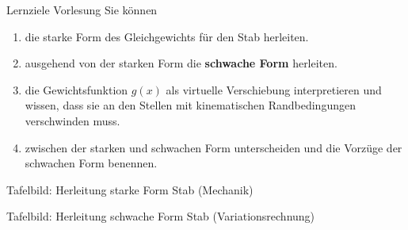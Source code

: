 \documentclass[aspectratio=169,professionalfonts]{beamer}
\begin{document}
\begin{frame}{Lernziele Vorlesung}
  \small
  Sie können
  \begin{enumerate}
    \item die starke Form des Gleichgewichts für den Stab herleiten.
    \item ausgehend von der starken Form die \textbf{schwache Form} herleiten.
    \item die Gewichtsfunktion $g(x)$ als virtuelle Verschiebung interpretieren und wissen, dass sie an den Stellen mit kinematischen Randbedingungen verschwinden muss.
    \item zwischen der starken und schwachen Form unterscheiden und die Vorzüge der schwachen Form benennen.
  \end{enumerate}
\end{frame}

\begin{frame}{Tafelbild: Herleitung starke Form Stab (Mechanik)}
\end{frame}

\begin{frame}{Tafelbild: Herleitung schwache Form Stab (Variationsrechnung)}
\end{frame}


\end{document}
